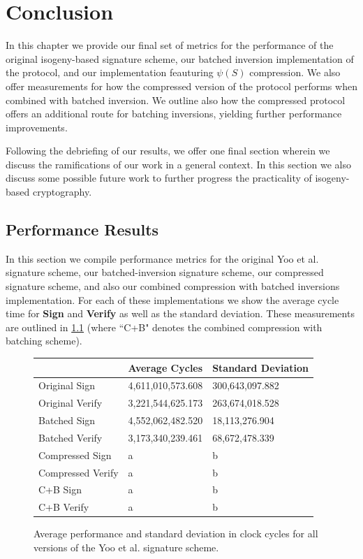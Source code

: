 \chapter{Conclusion}
\label{ch:conclusion}

In this chapter we provide our final set of metrics for the performance of the original isogeny-based signature scheme, our batched inversion implementation of the protocol, and our implementation feauturing $\psi(S)$ compression. We also offer measurements for how the compressed version of the protocol performs when combined with batched inversion. We outline also how the compressed protocol offers an additional route for batching inversions, yielding further performance improvements.

Following the debriefing of our results, we offer one final section wherein we discuss the ramifications of our work in a general context. In this section we also discuss some possible future work to further progress the practicality of isogeny-based cryptography.



\section{Performance Results}

In this section we compile performance metrics for the original Yoo et al. signature scheme, our batched-inversion signature scheme, our compressed signature scheme, and also our combined compression with batched inversions implementation. For each of these implementations we show the average cycle time for \textbf{Sign} and \textbf{Verify} as well as the standard deviation. These measurements are outlined in \ref{fig:allmeasurements} (where ``C+B" denotes the combined compression with batching scheme).

\begin{figure}
\begin{center}
\begin{tabular}{ | l | b | b | }
\hline
& Average Cycles & Standard Deviation \\
\hline
Original Sign & 4,611,010,573.608 & 300,643,097.882 \\
Original Verify & 3,221,544,625.173 & 263,674,018.528 \\
Batched Sign & 4,552,062,482.520 & 18,113,276.904 \\
Batched Verify & 3,173,340,239.461 & 68,672,478.339 \\
Compressed Sign & a & b \\
Compressed Verify & a & b \\
C+B Sign & a & b \\
C+B Verify & a & b \\
\hline
\end{tabular}
\end{center}
\caption{Average performance and standard deviation in clock cycles for all versions of the Yoo et al. signature scheme.}
\label{fig:allmeasurements}
\end{figure}


